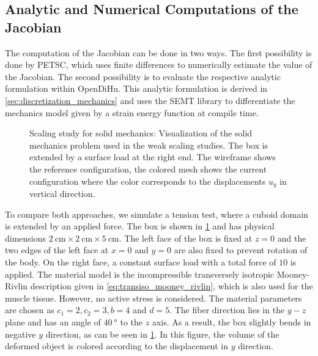 \subsection{Analytic and Numerical Computations of the Jacobian}\label{sec:analytic_numeric_jacobian}

The computation of the Jacobian can be done in two ways. The first possibility is done by PETSC, which uses finite differences to numerically estimate the value of the Jacobian. The second possibility is to evaluate the respective analytic formulation within OpenDiHu. This analytic formulation is derived in \cref{sec:discretization_mechanics} and uses the SEMT library \cite{semt} to differentiate the mechanics model given by a strain energy function at compile time.

\begin{figure}
  \centering%
  \def\svgwidth{0.6\textwidth}
  \caption{Scaling study for solid mechanics: Visualization of the solid mechanics problem used in the weak scaling studies. The box is extended by a surface load at the right end. The wireframe shows the reference configuration, the colored mesh shows the current configuration where the color corresponds to the displacements $u_y$ in vertical direction.}%
  \label{fig:mechanic_scenario}%
\end{figure}

To compare both approaches, we simulate a tension test, where a cuboid domain is extended by an applied force. 
The box is shown in \cref{fig:mechanic_scenario} and has physical dimensions $\SI{2}{\cm} \times \SI{2}{\cm} \times \SI{5}{\cm}$. The left face of the box is fixed at $z=0$ and the two edges of the left face at $x=0$ and $y=0$ are also fixed to prevent rotation of the body. On the right face, a constant surface load with a total force of $10$ is applied.
The material model is the incompressible transversely isotropic Mooney-Rivlin description given in \cref{eq:transiso_mooney_rivlin}, which is also used for the muscle tissue. However, no active stress is considered. The material parameters are chosen as $c_1=2, c_2=3, b = 4$ and $d = 5$. The fiber direction lies in the $y-z$ plane and has an angle of $\SI{40}{\degree}$ to the $z$ axis.
As a result, the box slightly bends in negative $y$ direction, as can be seen in \cref{fig:mechanic_scenario}. In this figure, the volume of the deformed object is colored according to the displacement in $y$ direction.

